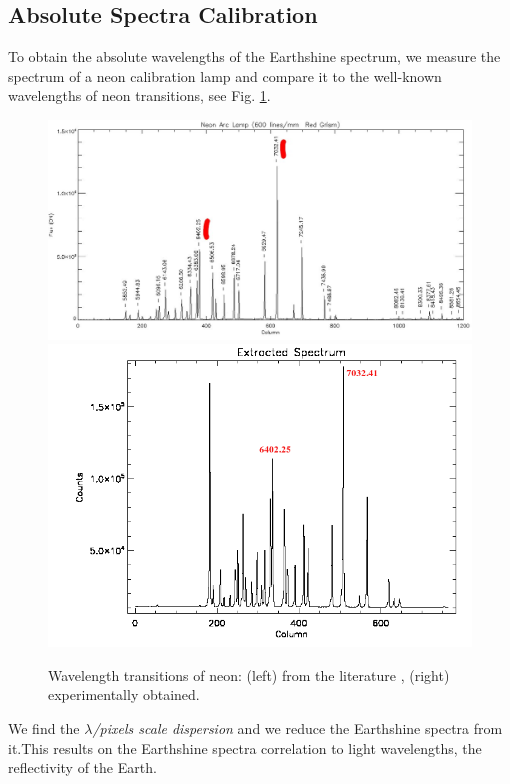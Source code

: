 \subsection{Absolute Spectra Calibration}
To obtain the absolute wavelengths of the Earthshine spectrum, we measure the
spectrum of a neon calibration lamp and compare it to the well-known wavelengths
of neon
transitions, see Fig. \ref{fig-neon}.

\begin{figure}[htb]
\begin{center}
\includegraphics[scale=0.2]{figs/neon.jpg}
\includegraphics[scale=0.45]{plots/neon1.png}
\caption{Wavelength transitions of neon: (left) from the literature
\cite{neon-wave}, (right)  experimentally obtained.}
\label{fig-neon}
\end{center}
\end{figure}

We find the {\it $\lambda$/pixels scale dispersion} and we reduce the
Earthshine spectra from it.This results on the Earthshine spectra 
correlation to light wavelengths, \ie the reflectivity of the Earth.

